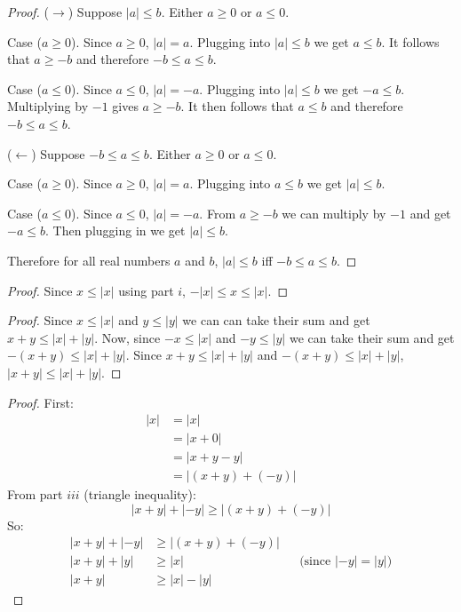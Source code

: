 \begin{proof}
    ($\rightarrow$) Suppose $|a| \le b$. Either $a \ge 0$ or $a \le 0$.

    Case ($a \ge 0$). Since $a \ge 0$, $|a| = a$. Plugging into $|a| \le b$ we get
    $a \le b$. It follows that $a \ge -b$ and therefore $-b \le a \le b$.

    Case ($a \le 0$). Since $a \le 0$, $|a| = -a$. Plugging into $|a| \le b$ we get
    $-a \le b$. Multiplying by $-1$ gives $a \ge -b$. It then follows that $a \le
        b$ and therefore $-b \le a \le b$. 

    ($\leftarrow$) Suppose $-b \le a \le b$. Either $a \ge 0$ or $a \le 0$.

    Case ($a \ge 0$). Since $a \ge 0$, $|a| = a$. Plugging into $a \le b$ we get
    $|a| \le b$.

    Case ($a \le 0$). Since $a \le 0$, $|a| = -a$. From $a \ge -b$ we can multiply
    by $-1$ and get $-a \le b$. Then plugging in we get $|a| \le b$.

    Therefore for all real numbers $a$ and $b$, $|a| \le b$ iff $-b \le a \le b$.
\end{proof}

\begin{proof}
    Since $x \le |x|$ using part $i$,
    $-|x| \le x \le |x|$.
\end{proof}

\begin{proof}
    Since $x \le |x|$ and $y \le  |y|$ we can can take their sum and get
    $x + y \le  |x| + |y|$. Now, since $-x \le |x|$ and $-y \le |y|$
    we can take their sum and get $-(x + y) \le |x| + |y|$.
    Since $x + y \le |x| + |y|$ and $-(x + y) \le |x| + |y|$,
    $|x + y| \le |x| + |y|$.
\end{proof}

\begin{proof}
    First:
    \begin{align*}
        |x| & = |x|              &  &   \\
            & = |x + 0|          &  &   \\
            & = |x + y - y|      &  &   \\
            & = |(x + y) + (-y)| &  & 
    \end{align*}
    From part $iii$ (triangle inequality):
    \[
        |x + y| + |-y| \ge |(x + y) + (-y)|
    \]
    So:
    \begin{align*}
        |x + y| + |-y| & \ge |(x + y) + (-y)| &  &                                    \\
        |x + y| + |y|  & \ge |x|              &  & \text{(since } |-y| = |y| \text{)} \\
        |x + y|        & \ge |x| - |y|        &  & 
    \end{align*}
\end{proof}

